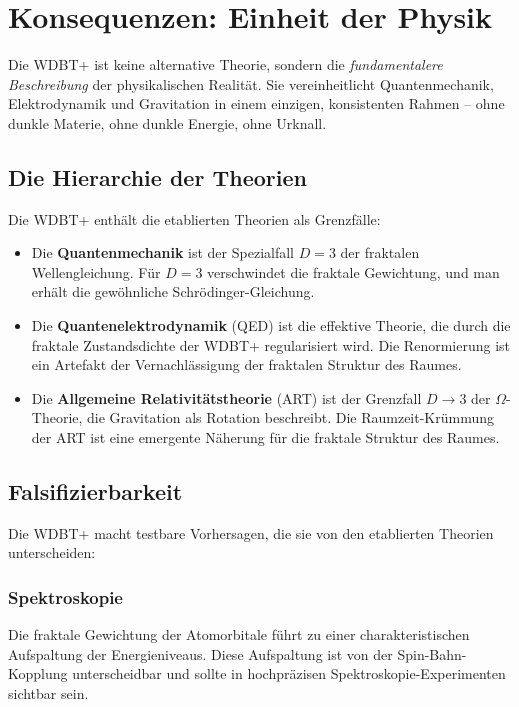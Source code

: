 \chapter{Konsequenzen: Einheit der Physik}

Die WDBT+ ist keine alternative Theorie, sondern die \emph{fundamentalere Beschreibung} der physikalischen Realität. Sie vereinheitlicht Quantenmechanik,
Elektrodynamik und Gravitation in einem einzigen, konsistenten Rahmen – ohne dunkle Materie, ohne dunkle Energie, ohne Urknall.

\section{Die Hierarchie der Theorien}

Die WDBT+ enthält die etablierten Theorien als Grenzfälle:

\begin{itemize}
    \item Die \textbf{Quantenmechanik} ist der Spezialfall \( D = 3 \) der fraktalen Wellengleichung. Für \( D = 3 \) verschwindet die fraktale Gewichtung, und man erhält die gewöhnliche Schrödinger-Gleichung.
    \item Die \textbf{Quantenelektrodynamik} (QED) ist die effektive Theorie, die durch die fraktale Zustandsdichte der WDBT+ regularisiert wird. Die Renormierung ist ein Artefakt der Vernachlässigung der fraktalen Struktur des Raumes.
    \item Die \textbf{Allgemeine Relativitätstheorie} (ART) ist der Grenzfall \( D \to 3 \) der \( \Omega \)-Theorie, die Gravitation als Rotation beschreibt. Die Raumzeit-Krümmung der ART ist eine emergente Näherung für die fraktale Struktur des Raumes.
\end{itemize}

\section{Falsifizierbarkeit}

Die WDBT+ macht testbare Vorhersagen, die sie von den etablierten Theorien unterscheiden:

\subsection{Spektroskopie}

Die fraktale Gewichtung der Atomorbitale führt zu einer charakteristischen Aufspaltung der Energieniveaus. Diese Aufspaltung ist von der Spin-Bahn-Kopplung
unterscheidbar und sollte in hochpräzisen Spektroskopie-Experimenten sichtbar sein.

